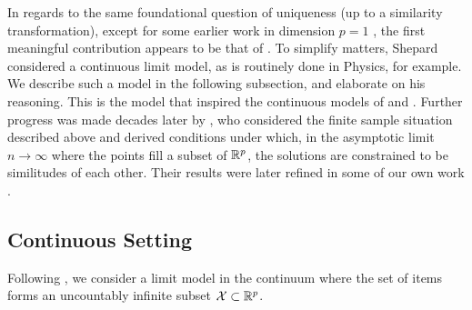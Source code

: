 \documentclass[twoside, 11pt]{article}
\begin{document}
In regards to the same foundational question of uniqueness (up to a similarity transformation), except for some earlier work in dimension $p=1$ \cite{suppes1955axiomatization, aumann1958coefficients}, the first meaningful contribution appears to be that of \citet{shepard1966metric}. To simplify matters, Shepard considered a continuous limit model, as is routinely done in Physics, for example. We describe such a model in the following subsection, and elaborate on his reasoning. This is the model that inspired the continuous models of  and .
Further progress was made decades later by \citet{klein}, who considered the finite sample situation described above and derived conditions under which, in the asymptotic limit $n\to\infty$ where the points fill a subset of $\mathbb{R}^p$, the solutions are constrained to be similitudes of each other. 
Their results were later refined in some of our own work \cite{arias2017some}.

\subsection{Continuous Setting}
\label{sec:mds continuum}
Following \citet{shepard1966metric}, we consider a limit model in the continuum where the set of items forms an uncountably infinite subset $\mathcal{X} \subset \mathbb{R}^p$.
\end{document}
